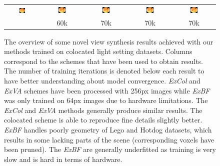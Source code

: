 \begin{figure}[!htb]
\begin{tabular*}{0.99\textwidth}{ c c c c c }
        \includegraphics[width=0.19\textwidth]{figures/results/col_set/hotdog2_targ_256px.png}
        &
        \includegraphics[width=0.19\textwidth]{figures/results/col_set/hotdog2_imnf_57k.png}
        &
        \includegraphics[width=0.19\textwidth]{figures/results/col_set/hotdog2_excol_150k.png}
        &
        \includegraphics[width=0.19\textwidth]{figures/results/col_set/hotdog2_exva_67k.png}
        &
        \includegraphics[width=0.19\textwidth]{figures/results/col_set/hotdog2_exbf_68k.png}
        \\ [-5pt]
        & 60k & 70k & 70k & 70k \\
        

    \end{tabular*}
    \caption{The overview of some novel view synthesis results achieved with our methods trained on colocated light setting datasets.
    Columns correspond to the schemes that have been used to obtain results.
    The number of training iterations is denoted below each result to have better understanding about model convergence.
    \textit{ExCol} and \textit{ExVA} schemes have been processed with 256px images
    while \textit{ExBF} was only trained on 64px images due to hardware limitations.
    The \textit{ExCol} and \textit{ExVA} methods generally produce similar results.
    The colocated scheme is able to reproduce fine details slightly better.
    \textit{ExBF} handles poorly geometry of Lego and Hotdog datasets,
    which results in some lacking parts of the scene
    (corresponding voxels have been pruned).
    The \textit{ExBF} are generally underfitted as training is very slow and is hard in terms of hardware.
    }
    \label{tab:coloc_allresults}
\end{figure}
\endgroup